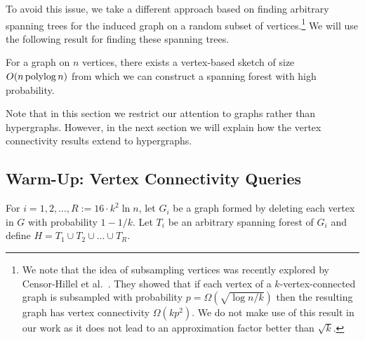 %
%

To avoid this issue, we take a different approach based on finding arbitrary spanning trees for the induced graph on a random subset of vertices.\footnote{We note that the idea of subsampling vertices
 was recently explored by Censor-Hillel et al.~\cite{Censor-HillelGK14,Censor-HillelGGHK15}. They showed that if each vertex of a $k$-vertex-connected graph is subsampled with probability $p=\Omega(\sqrt{\log n / k})$ then the resulting graph has vertex connectivity $\Omega(kp^2)$. We do not make use of this result in our work as it does not lead to an approximation factor better than $\sqrt{k}$.
} We will use the following result for finding these spanning trees.

\begin{theorem}\label{thm:spantree}
For a graph on $n$ vertices, there exists a vertex-based sketch of size $O(n\operatorname{polylog} n)$ from which we can construct a spanning forest with high probability.
\end{theorem}


Note that in this section we restrict our attention to graphs rather than hypergraphs. However, in the next section we will explain how the vertex connectivity results extend to hypergraphs.

\subsection{Warm-Up: Vertex Connectivity Queries }

For $i=1,2,\ldots, R:=16\cdot k^2 \ln n$, let $G_i$ be a graph formed by deleting each vertex in $G$ with probability $1-1/k$. Let $T_i$ be an arbitrary spanning forest of $G_i$ and define $H=T_1\cup T_2 \cup \ldots \cup T_R$.


